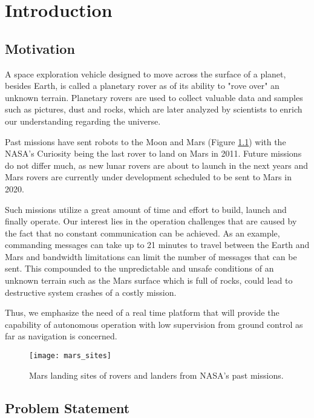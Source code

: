 \label{Chapter1}

\chapter{Introduction}

\section{Motivation}
A space exploration vehicle designed to move across the surface of a planet,
besides Earth, is called a planetary rover as of its ability to "rove over"
an unknown terrain.
Planetary rovers are used to collect valuable data and samples such as
pictures, dust and rocks, which are later analyzed by scientists to enrich
our understanding regarding the universe.

Past missions have sent robots to the Moon and Mars (Figure
\ref{fig:mars_sites}) with the NASA's Curiosity being the last rover to
land on Mars in 2011.
Future missions do not differ much, as new lunar rovers are about to launch
in the next years and Mars rovers are currently under development scheduled
to be sent to Mars in 2020.

Such missions utilize a great amount of time and effort to build,
launch and finally operate.
Our interest lies in the operation challenges that are caused by the fact
that no constant communication can be achieved.
As an example, commanding messages can take up to 21 minutes to travel
between the Earth and Mars and bandwidth limitations can limit the number
of messages that can be sent.
This compounded to the unpredictable and unsafe conditions of
an unknown terrain such as the Mars surface which is full of rocks,
could lead to destructive system crashes of a costly mission.

Thus, we emphasize the need of a real time platform that will provide the
capability of autonomous operation with low supervision from ground control
as far as navigation is concerned.

\begin{figure}[h!]
    \centering
    \texttt{[image: mars\_sites]}
    \caption[Mars landing sites]{
        Mars landing sites of rovers and landers from NASA's past missions.
    }
    \label{fig:mars_sites}
\end{figure}

\section{Problem Statement}

